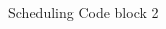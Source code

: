 \documentclass[notes xcolor=dvipsnames]{beamer}
\begin{document}
    \begin{frame}{Scheduling Code block 2}

        \begin{columns}
            
            \begin{column}{0.5\textwidth}
                \begin{figure}
                \end{figure}
                
            \end{column}

            \begin{column}{0.5\textwidth}

                \begin{figure}
                \end{figure}

                \begin{figure}
                \end{figure}
                
            \end{column}


        \end{columns}
        
        

    \end{frame}
\end{document}
